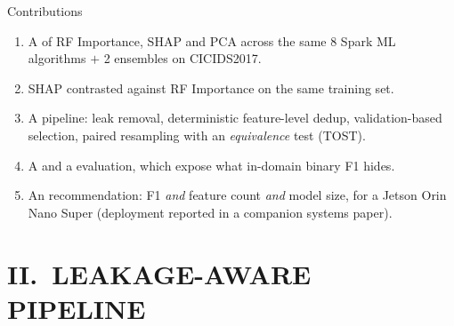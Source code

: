 \documentclass[aspectratio=169, 11pt]{beamer}
\begin{document}
\begin{frame}{Contributions}
  \begin{enumerate}
    \item A  of RF Importance, SHAP and PCA across the
          same 8 Spark ML algorithms $+$ 2 ensembles on CICIDS2017.
    \item SHAP contrasted  against RF Importance on the same
          training set.
    \item A  pipeline: leak removal,
          deterministic feature-level dedup, validation-based selection, paired
          resampling with an \emph{equivalence} test (TOST).
    \item A  and a  evaluation, which expose what in-domain binary F1 hides.
    \item An  recommendation: F1 \emph{and} feature count
          \emph{and} model size, for a Jetson Orin Nano Super (deployment
          reported in a companion systems paper).
  \end{enumerate}
\end{frame}

\section{II.\ LEAKAGE-AWARE PIPELINE}
\end{document}
